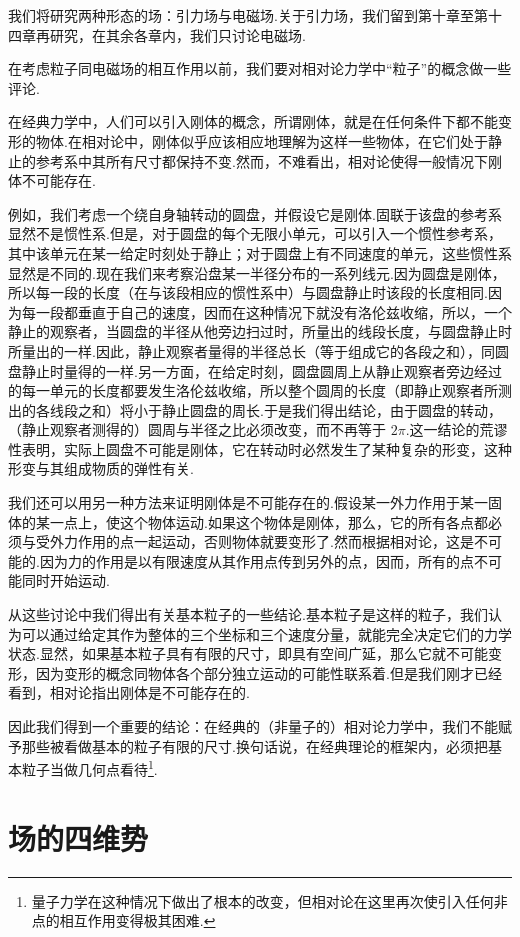 我们将研究两种形态的场：引力场与电磁场.关于引力场，我们留到第十章至第十四章再研究，在其余各章内，我们只讨论电磁场.

在考虑粒子同电磁场的相互作用以前，我们要对相对论力学中“粒子”的概念做一些评论.

在经典力学中，人们可以引入刚体的概念，所谓刚体，就是在任何条件下都不能变形的物体.在相对论中，刚体似乎应该相应地理解为这样一些物体，在它们处于静止的参考系中其所有尺寸都保持不变.然而，不难看出，相对论使得一般情况下刚体不可能存在.

例如，我们考虑一个绕自身轴转动的圆盘，并假设它是刚体.固联于该盘的参考系显然不是惯性系.但是，对于圆盘的每个无限小单元，可以引入一个惯性参考系，其中该单元在某一给定时刻处于静止；对于圆盘上有不同速度的单元，这些惯性系显然是不同的.现在我们来考察沿盘某一半径分布的一系列线元.因为圆盘是刚体，所以每一段的长度（在与该段相应的惯性系中）与圆盘静止时该段的长度相同.因为每一段都垂直于自己的速度，因而在这种情况下就没有洛伦兹收缩，所以，一个静止的观察者，当圆盘的半径从他旁边扫过时，所量出的线段长度，与圆盘静止时所量出的一样.因此，静止观察者量得的半径总长（等于组成它的各段之和），同圆盘静止时量得的一样.另一方面，在给定时刻，圆盘圆周上从静止观察者旁边经过的每一单元的长度都要发生洛伦兹收缩，所以整个圆周的长度（即静止观察者所测出的各线段之和）将小于静止圆盘的周长.于是我们得出结论，由于圆盘的转动，（静止观察者测得的）圆周与半径之比必须改变，而不再等于 $2\pi$.这一结论的荒谬性表明，实际上圆盘不可能是刚体，它在转动时必然发生了某种复杂的形变，这种形变与其组成物质的弹性有关.

我们还可以用另一种方法来证明刚体是不可能存在的.假设某一外力作用于某一固体的某一点上，使这个物体运动.如果这个物体是刚体，那么，它的所有各点都必须与受外力作用的点一起运动，否则物体就要变形了.然而根据相对论，这是不可能的.因为力的作用是以有限速度从其作用点传到另外的点，因而，所有的点不可能同时开始运动.

从这些讨论中我们得出有关基本粒子的一些结论.基本粒子是这样的粒子，我们认为可以通过给定其作为整体的三个坐标和三个速度分量，就能完全决定它们的力学状态.显然，如果基本粒子具有有限的尺寸，即具有空间广延，那么它就不可能变形，因为变形的概念同物体各个部分独立运动的可能性联系着.但是我们刚才已经看到，相对论指出刚体是不可能存在的.

因此我们得到一个重要的结论：在经典的（非量子的）相对论力学中，我们不能赋予那些被看做基本的粒子有限的尺寸.换句话说，在经典理论的框架内，必须把基本粒子当做几何点看待\footnote{量子力学在这种情况下做出了根本的改变，但相对论在这里再次使引入任何非点的相互作用变得极其困难.}.

\section{场的四维势}

